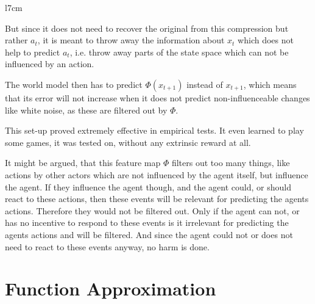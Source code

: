 \begin{wrapfigure}{l}{7cm}
\end{wrapfigure}
But since it does not need to recover the original from this compression but rather \(a_t\), it is meant to throw away the information about \(x_t\) which does not help to predict \(a_t\), i.e. throw away parts of the state space which can not be influenced by an action.

The world model then has to predict \(\Phi(x_{t+1})\) instead of \(x_{t+1}\), which means that its error will not increase when it does not predict non-influenceable changes like white noise, as these are filtered out by \(\Phi\).

This set-up proved extremely effective in empirical tests. It even learned to play some games, it was tested on, without any extrinsic reward at all. 

It might be argued, that this feature map \(\Phi\) filters out too many things, like actions by other actors which are not influenced by the agent itself, but influence the agent. If they influence the agent though, and the agent could, or should react to these actions, then these events will be relevant for predicting the agents actions. Therefore they would not be filtered out. Only if the agent can not, or has no incentive to respond to these events is it irrelevant for predicting the agents actions and will be filtered. And since the agent could not or does not need to react to these events anyway, no harm is done. 

\section{Function Approximation}

